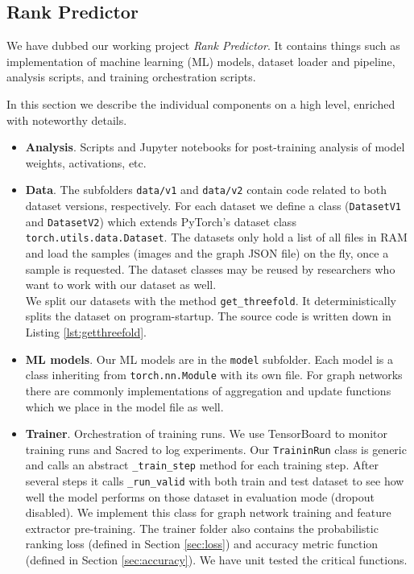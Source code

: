 \subsection{Rank Predictor}

We have dubbed our working project \textit{Rank Predictor}. It contains things such as implementation of machine learning (ML) models, dataset loader and pipeline, analysis scripts, and training orchestration scripts.

In this section we describe the individual components on a high level, enriched with noteworthy details.

\begin{itemize}
    \item \textbf{Analysis}. Scripts and Jupyter notebooks for post-training analysis of model weights, activations, etc.
    \item \textbf{Data}. The subfolders \texttt{data/v1} and \texttt{data/v2} contain code related to both dataset versions, respectively. For each dataset we define a class (\texttt{DatasetV1} and \texttt{DatasetV2}) which extends PyTorch's dataset class \texttt{torch.utils.data.Dataset}. The datasets only hold a list of all files in RAM and load the samples (images and the graph JSON file) on the fly, once a sample is requested. The dataset classes may be reused by researchers who want to work with our dataset as well.\\
    We split our datasets with the method \texttt{get\_threefold}. It deterministically splits the dataset on program-startup. The source code is written down in Listing \ref{lst:getthreefold}.
    \item \textbf{ML models}. Our ML models are in the \texttt{model} subfolder. Each model is a class inheriting from \texttt{torch.nn.Module} with its own file. For graph networks there are commonly implementations of aggregation and update functions which we place in the model file as well.
    \item \textbf{Trainer}. Orchestration of training runs. We use TensorBoard to monitor training runs and Sacred to log experiments. Our \texttt{TraininRun} class is generic and calls an abstract \texttt{\_train\_step} method for each training step. After several steps it calls \texttt{\_run\_valid} with both train and test dataset to see how well the model performs on those dataset in evaluation mode (dropout disabled). We implement this class for graph network training and feature extractor pre-training. The trainer folder also contains the probabilistic ranking loss (defined in Section \ref{sec:loss}) and accuracy metric function (defined in Section \ref{sec:accuracy}). We have unit tested the critical functions.
\end{itemize}

